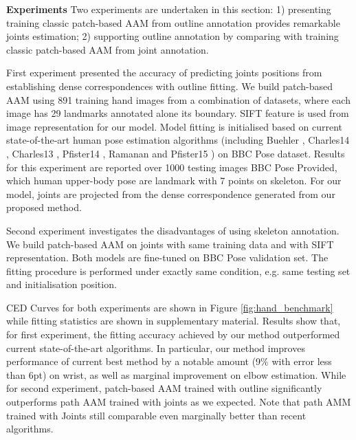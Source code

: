 \textbf{Experiments} Two experiments are undertaken in this section: 1) presenting training classic patch-based AAM from outline annotation provides remarkable joints estimation; 2) supporting outline annotation by comparing with training classic patch-based AAM from joint annotation.

First experiment presented the accuracy of predicting joints positions from establishing dense correspondences with outline fitting. We build patch-based AAM using 891 training hand images from a combination of datasets, where each image has 29 landmarks annotated alone its boundary. SIFT \cite{PoseletsICCV09} feature is used from image representation for our model. Model fitting is initialised based on current state-of-the-art human pose estimation algorithms (including Buehler \cite{buehler2011upper}, Charles14 \cite{charles2014upper}, Charles13 \cite{charles2013domain}, Pfister14 \cite{pfister2015deep}, Ramanan \cite{yang2013articulated} and Pfister15 \cite{pfister2015flowing}) on BBC Pose \cite{pfister2015flowing} dataset. Results for this experiment are reported over 1000 testing images BBC Pose Provided, which human upper-body pose are landmark with 7 points on skeleton. For our model, joints are projected from the dense correspondence generated from our proposed method.

Second experiment investigates the disadvantages of using skeleton annotation. We build patch-based AAM on joints with same training data and with SIFT representation. Both models are fine-tuned on BBC Pose validation set. The fitting procedure is performed under exactly same condition, e.g. same testing set and initialisation position.

CED Curves for both experiments are shown in Figure \ref{fig:hand_benchmark} while fitting statistics are shown in supplementary material. Results show that, for first experiment, the fitting accuracy achieved by our method outperformed current state-of-the-art algorithms. In particular, our method improves performance of current best method \cite{pfister2015flowing} by a notable amount (9\% with error less than 6pt) on wrist, as well as marginal improvement on elbow estimation. While for second experiment, patch-based AAM trained with outline significantly outperforms path AAM trained with joints as we expected. Note that path AMM trained with Joints still comparable even marginally better than recent algorithms.




